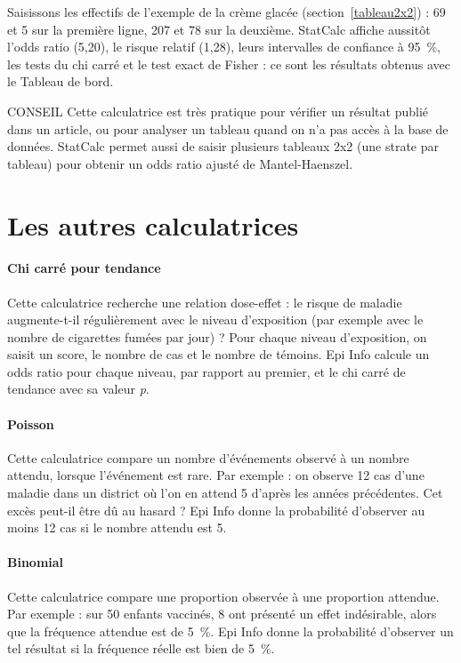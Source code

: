 Saisissons les effectifs de l'exemple de la crème glacée (section~\ref{tableau2x2}) : 69 et 5 sur la première ligne, 207 et 78 sur la deuxième. StatCalc affiche aussitôt l'odds ratio (5,20), le risque relatif (1,28), leurs intervalles de confiance à 95~\%, les tests du chi carré et le test exact de Fisher : ce sont les résultats obtenus avec le Tableau de bord.

\begin{mybox}[colbacktitle=TIP]{\faLightbulb{} CONSEIL}
Cette calculatrice est très pratique pour vérifier un résultat publié dans un article, ou pour analyser un tableau quand on n'a pas accès à la base de données. StatCalc permet aussi de saisir plusieurs tableaux 2x2 (une strate par tableau) pour obtenir un odds ratio ajusté de Mantel-Haenszel.
\end{mybox}

\section{Les autres calculatrices}

\paragraph{Chi carré pour tendance} Cette calculatrice recherche une relation dose-effet : le risque de maladie augmente-t-il régulièrement avec le niveau d'exposition (par exemple avec le nombre de cigarettes fumées par jour) ? Pour chaque niveau d'exposition, on saisit un score, le nombre de cas et le nombre de témoins. Epi Info calcule un odds ratio pour chaque niveau, par rapport au premier, et le chi carré de tendance avec sa valeur \textit{p}.

\paragraph{Poisson} Cette calculatrice compare un nombre d'événements observé à un nombre attendu, lorsque l'événement est rare. Par exemple : on observe 12 cas d'une maladie dans un district où l'on en attend 5 d'après les années précédentes. Cet excès peut-il être dû au hasard ? Epi Info donne la probabilité d'observer au moins 12 cas si le nombre attendu est 5.

\paragraph{Binomial} Cette calculatrice compare une proportion observée à une proportion attendue. Par exemple : sur 50 enfants vaccinés, 8 ont présenté un effet indésirable, alors que la fréquence attendue est de 5~\%. Epi Info donne la probabilité d'observer un tel résultat si la fréquence réelle est bien de 5~\%.

